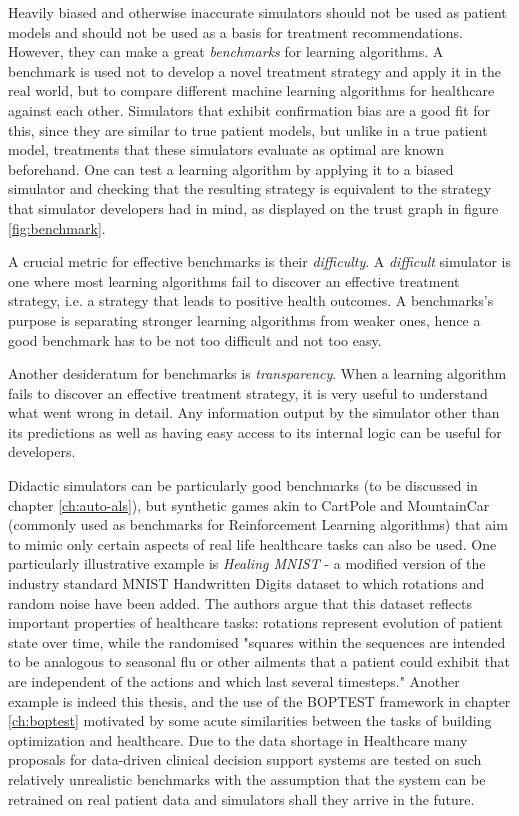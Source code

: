 Heavily biased and otherwise inaccurate simulators should not be used as patient models and should not be used as a basis for treatment recommendations.
However, they can make a great \emph{benchmarks} for learning algorithms.
A benchmark is used not to develop a novel treatment strategy and apply it in the real world, but to compare different machine learning algorithms for healthcare against each other.
Simulators that exhibit confirmation bias are a good fit for this, since they are similar to true patient models, but unlike in a true patient model, treatments that these simulators evaluate as optimal are known beforehand.
One can test a learning algorithm by applying it to a biased simulator and checking that the resulting strategy is equivalent to the strategy that simulator developers had in mind, as displayed on the trust graph in figure \ref{fig:benchmark}.

A crucial metric for effective benchmarks is their \emph{difficulty}.
A \emph{difficult} simulator is one where most learning algorithms fail to discover an effective treatment strategy, i.e. a strategy that leads to positive health outcomes.
A benchmarks's purpose is separating stronger learning algorithms from weaker ones, hence a good benchmark has to be not too difficult and not too easy.

Another desideratum for benchmarks is \emph{transparency}.
When a learning algorithm fails to discover an effective treatment strategy, it is very useful to understand what went wrong in detail.
Any information output by the simulator other than its predictions as well as having easy access to its internal logic can be useful for developers.

Didactic simulators can be particularly good benchmarks (to be discussed in chapter \ref{ch:auto-als}), but synthetic games akin to CartPole \cite{bartoNeuronlikeAdaptiveElements1983} and MountainCar \cite{mooreEfficientMemorybasedLearning1990} (commonly used as benchmarks for Reinforcement Learning algorithms) that aim to mimic only certain aspects of real life healthcare tasks can also be used.
One particularly illustrative example is \emph{Healing MNIST} \cite{krishnanDeepKalmanFilters2015} - a modified version of the industry standard MNIST Handwritten Digits \cite{dengMNISTDatabaseHandwritten2012} dataset to which rotations and random noise have been added.
The authors argue that this dataset reflects important properties of healthcare tasks: rotations represent evolution of patient state over time, while the randomised "squares within the sequences are intended to be analogous to seasonal flu or other ailments that a patient could exhibit that are independent of the actions and which last several timesteps."
Another example is indeed this thesis, and the use of the BOPTEST framework in chapter \ref{ch:boptest} motivated by some acute similarities between the tasks of building optimization and healthcare.
Due to the data shortage in Healthcare many proposals for data-driven clinical decision support systems are tested on such relatively unrealistic benchmarks with the assumption that the system can be retrained on real patient data and simulators shall they arrive in the future.

